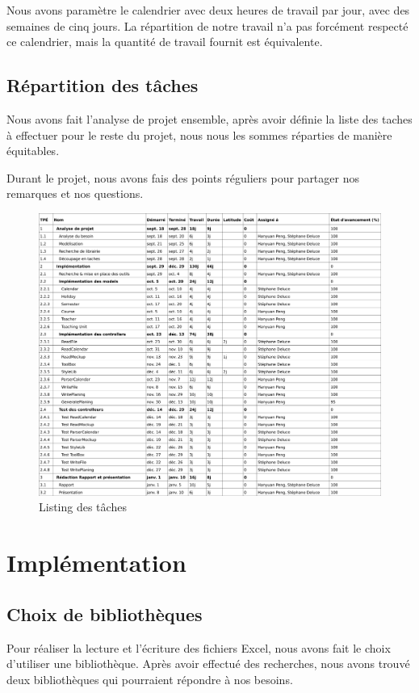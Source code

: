\documentclass{polytech/polytech}
\begin{document}
	Nous avons paramètre le calendrier avec deux heures de travail par jour, avec des semaines de cinq jours.
	La répartition de notre travail n'a pas forcément respecté ce calendrier, mais la quantité de travail fournit est équivalente.

	\section{Répartition des tâches}

	Nous avons fait l'analyse de projet ensemble, après avoir définie la liste des taches à effectuer pour le reste du projet, nous nous les sommes réparties de manière équitables.

	Durant le projet, nous avons fais des points réguliers pour partager nos remarques et nos questions.

	\begin{figure}
		\caption{Listing des tâches}
		\includegraphics[width=\textwidth]{./img/taches-list.png}
	\end{figure}

	\chapter{Implémentation}

	\section{Choix de bibliothèques}

	Pour réaliser la lecture et l'écriture des fichiers Excel, nous avons fait le choix d'utiliser une bibliothèque.
	Après avoir effectué des recherches, nous avons trouvé deux bibliothèques qui pourraient répondre à nos besoins.
\end{document}
